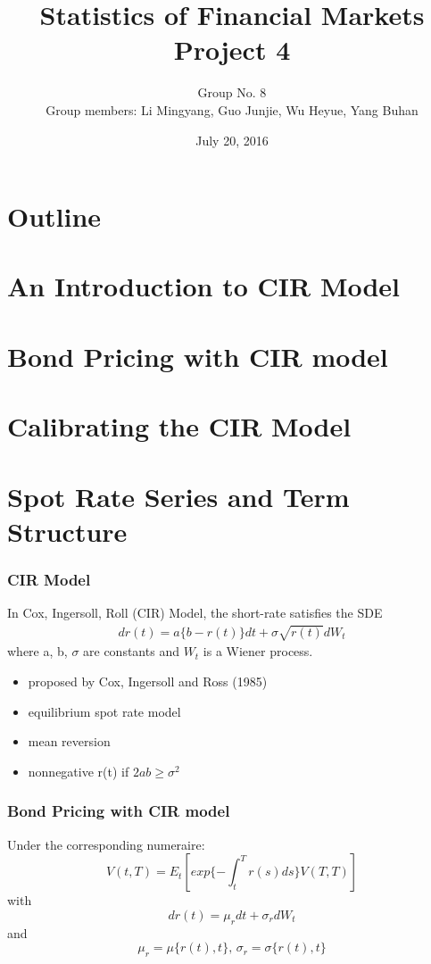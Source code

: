 \documentclass[11pt]{beamer}
\author{Group No. 8 \\ Group members: Li Mingyang,  Guo Junjie, Wu Heyue, Yang Buhan}
\title{Statistics of Financial Markets \\
	Project 4}
\date{July 20, 2016}
\begin{document}
	\maketitle
	
	\section*{Outline}
		\begin{frame}
	    	\tableofcontents
    	\end{frame}
    	
    \section{An Introduction to CIR Model}
    \section{Bond Pricing with CIR model}
    \section{Calibrating the CIR Model}
    \section{Spot Rate Series and Term Structure}
	
	\begin{frame}
		\frametitle{CIR Model}
		\begin{definition}
			In \alert{Cox, Ingersoll, Roll (CIR) Model}, the short-rate satisfies the SDE
			\begin{align}
			dr(t)=a\{b-r(t)\}dt+\sigma \sqrt{r(t)}dW_t
			\end{align}
			where a, b, $ \sigma $ are constants and $ W_t $ is a Wiener process.
		\end{definition}
		
		\begin{itemize}
			\item proposed by Cox, Ingersoll and Ross (1985)
			\item equilibrium spot rate model
            \item mean reversion
			\item nonnegative r(t) if $ 2ab\geq\sigma^2 $
		\end{itemize}
		
	\end{frame}
	
	\begin{frame}
		\frametitle{Bond Pricing with CIR model}
		Under the corresponding numeraire:
		\[
		V(t,T)=E_t[exp\{-\int_{t}^{T}r(s)ds\}V(T,T)]
		\]
		with
		\[
		dr(t)=\mu_rdt+\sigma_rdW_t
		\]
		and
		\[
		\mu_r=\mu\{r(t),t\}, \, \sigma_r=\sigma\{r(t),t\}
		\]
	\end{frame}
	
\end{document}
